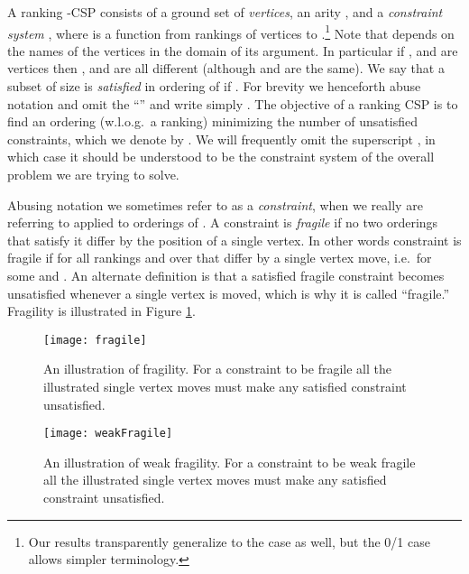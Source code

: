 \documentclass[dvips,11pt,letter]{article}
\begin{document}
{A ranking -CSP consists of a ground set  of \emph{vertices}, an arity , and a \emph{constraint system} , where  is a function from rankings of  vertices to .\footnote{Our results transparently generalize to the  case as well, but the 0/1 case allows simpler terminology.}
Note that  depends on the names of the vertices in the domain of its argument. In particular if ,  and  are vertices then ,   and  are all different (although  and  are the same).
We say that a subset  of size  is \emph{satisfied} in ordering  of  if . For brevity we henceforth abuse notation and omit the ``'' and  write simply . The objective of a ranking CSP is to find an ordering  (w.l.o.g.\ a ranking) minimizing the number of unsatisfied constraints, which we denote by . We will frequently omit the superscript , in which case it should be understood to be the constraint system of the overall problem we are trying to solve.

Abusing notation we sometimes refer to  as a \emph{constraint}, when we really are referring to  applied to orderings of .
A constraint  is \emph{fragile} if no two orderings that satisfy it differ by the position of a single vertex. In other words constraint  is fragile if  for all rankings  and  over  that differ by a single vertex move, i.e.\  for some  and . An alternate definition is that a satisfied fragile constraint becomes unsatisfied whenever a single vertex is moved, which is why it is called ``fragile.'' Fragility is illustrated in Figure \ref{fig:fragile}.

\begin{figure}[t]
\begin{center}
\texttt{[image: fragile]}
\end{center}
\caption{An illustration of fragility. For a constraint to be fragile all the illustrated single vertex moves must make any satisfied constraint unsatisfied.}
\label{fig:fragile}
\end{figure}

\begin{figure}[t]
\vspace{1.5em} \begin{center}
\texttt{[image: weakFragile]}
\end{center}
\caption{An illustration of weak fragility. For a constraint to be weak fragile all the illustrated single vertex moves must make any satisfied constraint unsatisfied.}
\label{fig:weakFragile}
\end{figure}

}
\end{document}

